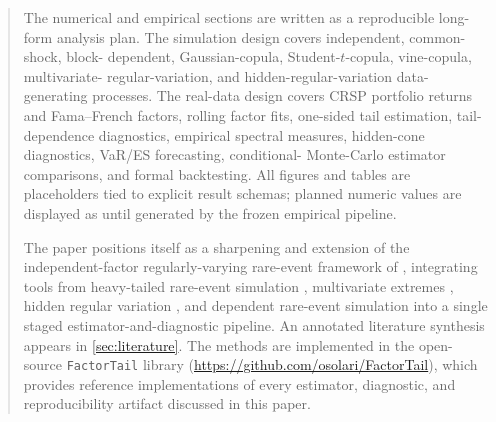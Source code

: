 \begin{abstract}
The numerical and empirical sections are written as a reproducible long-form
analysis plan. The simulation design covers independent, common-shock, block-
dependent, Gaussian-copula, Student-$t$-copula, vine-copula, multivariate-
regular-variation, and hidden-regular-variation data-generating processes. The
real-data design covers CRSP portfolio returns and Fama--French factors, rolling
factor fits, one-sided tail estimation, tail-dependence diagnostics, empirical
spectral measures, hidden-cone diagnostics, VaR/ES forecasting, conditional-
Monte-Carlo estimator comparisons, and formal backtesting. All figures and
tables are placeholders tied to explicit result schemas; planned numeric values
are displayed as \xx{} until generated by the frozen empirical pipeline.

\medskip\noindent The paper positions itself as a sharpening and extension of
the independent-factor regularly-varying rare-event framework of
\citet{PourbabaeeSolari2019}, integrating tools from heavy-tailed rare-event
simulation \citep{AsmussenKroese2006,HartingerKortschak2009}, multivariate
extremes \citep{HultLindskogMikoschSamorodnitsky2005,Resnick2007}, hidden
regular variation \citep{LedfordTawn1996,MaulikResnick2005}, and dependent
rare-event simulation
\citep{BlanchetRojasNandayapa2011,ChengFuhPang2025} into a single staged
estimator-and-diagnostic pipeline. An annotated literature synthesis appears
in \cref{sec:literature}. The methods are implemented in the open-source
\texttt{FactorTail} library
(\url{https://github.com/osolari/FactorTail}), which provides reference
implementations of every estimator, diagnostic, and reproducibility artifact
discussed in this paper.
\end{abstract}
